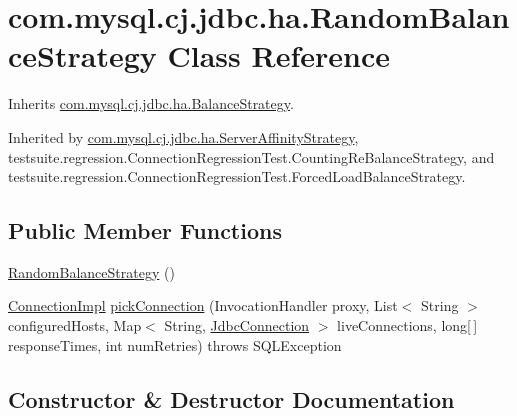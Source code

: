 \hypertarget{classcom_1_1mysql_1_1cj_1_1jdbc_1_1ha_1_1_random_balance_strategy}{}\section{com.\+mysql.\+cj.\+jdbc.\+ha.\+Random\+Balance\+Strategy Class Reference}
\label{classcom_1_1mysql_1_1cj_1_1jdbc_1_1ha_1_1_random_balance_strategy}


Inherits \mbox{\hyperlink{interfacecom_1_1mysql_1_1cj_1_1jdbc_1_1ha_1_1_balance_strategy}{com.\+mysql.\+cj.\+jdbc.\+ha.\+Balance\+Strategy}}.



Inherited by \mbox{\hyperlink{classcom_1_1mysql_1_1cj_1_1jdbc_1_1ha_1_1_server_affinity_strategy}{com.\+mysql.\+cj.\+jdbc.\+ha.\+Server\+Affinity\+Strategy}}, testsuite.\+regression.\+Connection\+Regression\+Test.\+Counting\+Re\+Balance\+Strategy, and testsuite.\+regression.\+Connection\+Regression\+Test.\+Forced\+Load\+Balance\+Strategy.

\subsection*{Public Member Functions}
\begin{DoxyCompactItemize}
\item 
\mbox{\hyperlink{classcom_1_1mysql_1_1cj_1_1jdbc_1_1ha_1_1_random_balance_strategy_a0432f638b3b79d386023580e7780e343}{Random\+Balance\+Strategy}} ()
\item 
\mbox{\hyperlink{classcom_1_1mysql_1_1cj_1_1jdbc_1_1_connection_impl}{Connection\+Impl}} \mbox{\hyperlink{classcom_1_1mysql_1_1cj_1_1jdbc_1_1ha_1_1_random_balance_strategy_aefbfa275d5d20205e6eb812224da5a2c}{pick\+Connection}} (Invocation\+Handler proxy, List$<$ String $>$ configured\+Hosts, Map$<$ String, \mbox{\hyperlink{interfacecom_1_1mysql_1_1cj_1_1jdbc_1_1_jdbc_connection}{Jdbc\+Connection}} $>$ live\+Connections, long\mbox{[}$\,$\mbox{]} response\+Times, int num\+Retries)  throws S\+Q\+L\+Exception 
\end{DoxyCompactItemize}


\subsection{Constructor \& Destructor Documentation}
\mbox{\label{classcom_1_1mysql_1_1cj_1_1jdbc_1_1ha_1_1_random_balance_strategy_a0432f638b3b79d386023580e7780e343}} 
